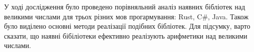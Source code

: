 
У ході дослідження було проведено порівняльний аналіз наявних бібліотек над великими числами для трьох різних мов прогармування: Rust, C\#, Java. Також було виділено основні методи реалізації подібних бібліотек. Для підсумку, варто сказати, що наявні бібіліотеки ефективно реалізують арифметики над великими числами.